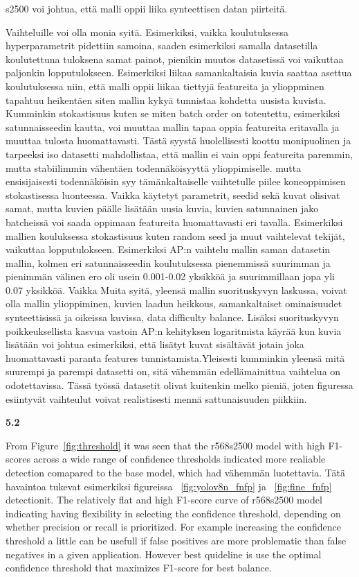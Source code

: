 s2500 voi johtua, että malli oppii liika synteettisen datan piirteitä. 

Vaihteluille voi olla monia syitä. Esimerkiksi, vaikka koulutuksessa hyperparametrit pidettiin samoina, saaden esimerkiksi samalla datasetilla koulutettuna tuloksena samat painot, pienikin muutos datasetissä voi vaikuttaa paljonkin lopputulokseen. Esimerkiksi liikaa samankaltaisia kuvia saattaa asettua koulutuksessa niin, että malli oppii liikaa tiettyjä featureita ja ylioppminen tapahtuu heikentäen siten mallin kykyä tunnistaa kohdetta uusista kuvista. Kumminkin stokastisuus kuten se miten batch order on toteutettu, esimerkiksi satunnaisseedin kautta, voi muuttaa mallin tapaa oppia featureita eritavalla ja muuttaa tulosta huomattavasti. Tästä syystä huolellisesti koottu monipuolinen ja tarpeeksi iso datasetti mahdollistaa, että mallin ei vain oppi featureita paremmin, mutta stabiilimmin vähentäen todennäköisyyttä ylioppimiselle.
mutta ensisijaisesti todennäköisin syy tämänkaltaiselle vaihtetulle piilee koneoppimisen stokastisessa luonteessa. Vaikka käytetyt parametrit, seedid sekä kuvat olisivat samat, mutta kuvien päälle lisätään uusia kuvia, kuvien satunnainen jako batcheissä voi saada oppimaan featureita huomattavasti eri tavalla.   Esimerkiksi mallien kouluksessa stokastisuus kuten random seed ja muut vaihtelevat tekijät, vaikuttaa lopputulokseen. Esimerkiksi \cite{ebadi2022peoplesanspeoplesyntheticdatagenerator} AP:n vaihtelu mallin saman datasetin mallin, kolmen eri satunnaisseedin koulutuksessa pienemmissä suurimman ja pienimmän välinen ero oli usein 0.001-0.02 yksikköä ja suurimmillaan jopa yli 0.07 yksikköä. Vaikka
 Muita syitä, yleensä mallin suorituskyvyn laskussa, voivat olla mallin ylioppiminen, kuvien laadun heikkous, samankaltaiset ominaisuudet synteettisissä ja oikeissa kuvissa, data difficulty balance. Lisäksi suorituskyvyn poikkeuksellista kasvua vastoin AP:n kehityksen logaritmista käyrää kun kuvia lisätään voi johtua esimerkiksi, että lisätyt kuvat sisältävät jotain joka huomattavasti paranta features tunnistamista.Yleisesti kumminkin yleensä mitä suurempi ja parempi datasetti on, sitä vähemmän edellämainittua vaihtelua on odotettavissa. Tässä työssä datasetit olivat kuitenkin melko pieniä, joten figuressa esiintyvät vaihteulut voivat realistisesti mennä sattunaisuuden piikkiin.


\textbf{5.2}

From Figure~\ref{fig:threshold} it was seen that the r568s2500 model with high F1-scores across a wide range of confidence thresholds indicated more realiable detection comapared to the base model, which had vähemmän luotettavia. Tätä havaintoa tukevat esimerkiksi figureissa ~\ref{fig:yolov8n_fnfp} ja ~\ref{fig:fine_fnfp} detectionit. The relatively flat and high F1-score curve of r568s2500 model indicating having flexibility in selecting the confidence threshold, depending on whether precision or recall is prioritized. For example increasing the confidence threshold a little can be usefull if false positives are more problematic than false negatives in a given application. However best quideline is use the optimal confidence threshold that maximizes F1-score for best balance.

